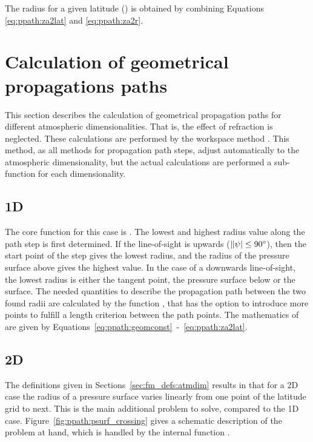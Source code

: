 The radius for a given latitude ()
is obtained by combining Equations \ref{eq:ppath:za2lat} and
\ref{eq:ppath:za2r}.



\section{Calculation of geometrical propagations paths}
\label{sec:ppath:stepcalc}

This section describes the calculation of geometrical propagation
paths for different atmospheric dimensionalities. That is, the effect
of refraction is neglected. These calculations are performed by the
workspace method . This method, as all
methods for propagation path steps, adjust automatically to the
atmospheric dimensionality, but the actual calculations are performed
a sub-function for each dimensionality.


\subsection{1D}
\label{sec:ppath:1Dgeom}

The core function for this case is . The
lowest and highest radius value along the path step is first
determined. If the line-of-sight is upwards ($\|\psi| \leq
90^\circ$), then the start point of the step gives the lowest radius,
and the radius of the pressure surface above gives the highest value.
In the case of a downwards line-of-sight, the lowest radius is either
the tangent point, the pressure surface below or the surface. The
needed quantities to describe the propagation path between the two
found radii are calculated by the function
, that has the option to
introduce more points to fulfill a length criterion between the path
points. The mathematics of  are
given by Equations~\ref{eq:ppath:geomconst}~-~\ref{eq:ppath:za2lat}.


\subsection{2D}
\label{sec:ppath:2Dgeom}

The definitions given in Sections~\ref{sec:fm_defs:atmdim} results in
that for a 2D case the radius of a pressure surface varies linearly
from one point of the latitude grid to next. This is the main
additional problem to solve, compared to the 1D case.
Figure~\ref{fig:ppath:psurf_crossing} gives a schematic description of
the problem at hand, which is handled by the internal function
.

